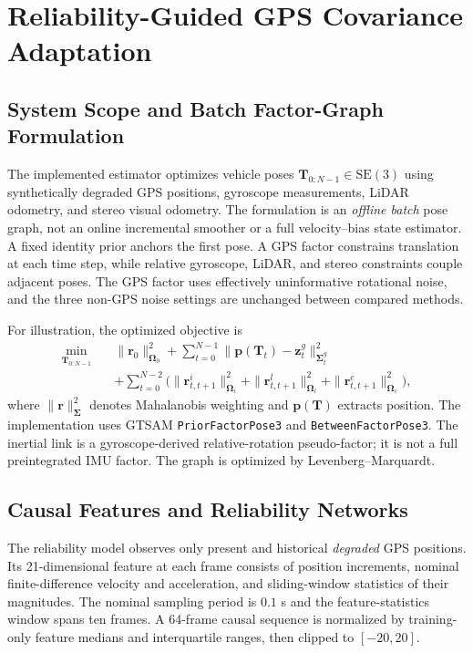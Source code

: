 \section{Reliability-Guided GPS Covariance Adaptation}
\label{sec:method_v7}

\subsection{System Scope and Batch Factor-Graph Formulation}
The implemented estimator optimizes vehicle poses
$\mathbf{T}_{0:N-1}\in\mathrm{SE}(3)$ using synthetically degraded
GPS positions, gyroscope measurements, LiDAR odometry, and stereo
visual odometry. The formulation is an \emph{offline batch} pose graph,
not an online incremental smoother or a full velocity--bias
state estimator. A fixed identity prior anchors the first pose.
A GPS factor constrains translation at each time step, while
relative gyroscope, LiDAR, and stereo constraints couple adjacent
poses. The GPS factor uses effectively uninformative rotational
noise, and the three non-GPS noise settings are unchanged between
compared methods.

For illustration, the optimized objective is
\begin{equation}
\begin{aligned}
\min_{\mathbf{T}_{0:N-1}}\quad&
\|\mathbf{r}_{0}\|_{\mathbf{\Omega}_0}^{2}+
\sum_{t=0}^{N-1}
\|\mathbf{p}(\mathbf{T}_t)-\mathbf{z}^{g}_t
\|_{\mathbf{\Sigma}^{g}_t}^{2}\\
&+\sum_{t=0}^{N-2}\bigl(
\|\mathbf{r}^{i}_{t,t+1}\|_{\mathbf{\Omega}_i}^{2}+
\|\mathbf{r}^{l}_{t,t+1}\|_{\mathbf{\Omega}_l}^{2}+
\|\mathbf{r}^{c}_{t,t+1}\|_{\mathbf{\Omega}_c}^{2}\bigr),
\end{aligned}
\label{eq:v7_objective}
\end{equation}
where $\|\mathbf{r}\|_{\mathbf{\Sigma}}^2$ denotes Mahalanobis
weighting and $\mathbf{p}(\mathbf{T})$ extracts position.
The implementation uses GTSAM \texttt{PriorFactorPose3} and
\texttt{BetweenFactorPose3}. The inertial link is a
gyroscope-derived relative-rotation pseudo-factor; it is not
a full preintegrated IMU factor. The graph is optimized by
Levenberg--Marquardt.

\subsection{Causal Features and Reliability Networks}
The reliability model observes only present and historical
\emph{degraded} GPS positions. Its 21-dimensional feature at
each frame consists of position increments, nominal
finite-difference velocity and acceleration, and sliding-window
statistics of their magnitudes. The nominal sampling period is
$0.1$ s and the feature-statistics window spans ten frames.
A 64-frame causal sequence is normalized by training-only
feature medians and interquartile ranges, then clipped to
$[-20,20]$.

